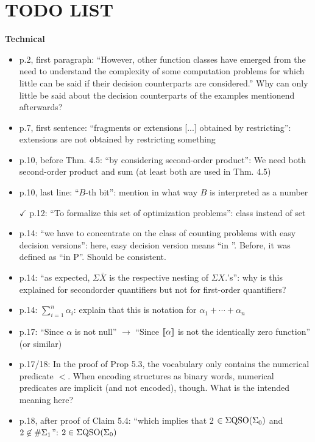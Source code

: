 
\section*{\LARGE \textbf{TODO LIST}}

\bigskip

{\bf Technical}

\begin{itemize}
	\setlength\itemsep{0.5em}
\item p.2, first paragraph: ``However, other function classes have emerged from the need to understand
the complexity of some computation problems for which little can be said if their
decision counterparts are considered.'' Why can only little be said about the decision counterparts
of the examples mentionend afterwards?
\item p.7, first sentence: ``fragments or extensions [...] obtained by restricting'': extensions are not
obtained by restricting something
\item p.10, before Thm. 4.5: ``by considering second-order product'': We need both second-order
product and sum (at least both are used in Thm. 4.5)
\item p.10, last line: ``$B$-th bit'': mention in what way $B$ is interpreted as a number
\item[$\checkmark$] p.12: ``To formalize this set of optimization problems'': class instead of set
\item p.14: ``we have to concentrate on the class of counting problems with easy decision versions'':
here, easy decision version means ``in \bpp''. Before, it was defined as ``in P''. Should be
consistent.
\item p.14: ``as expected, $\Sigma \bar{X}$ is the respective nesting of $\Sigma X.$’s'': why is this explained for secondorder
quantifiers but not for first-order quantifiers?
\item p.14: $\sum_{i=1}^n\alpha_i$: explain that this is notation for $\alpha_1+\cdots+\alpha_n$
\item p.17: ``Since $\alpha$ is not null'' $\to$ ``Since ${\llbracket{}{\alpha}\rrbracket}$ is not the identically zero function'' (or similar)
\item p.17/18: In the proof of Prop 5.3, the vocabulary only contains the numerical predicate $<$. When encoding structures as binary words, numerical predicates are implicit (and not
encoded), though. What is the intended meaning here?
\item p.18, after proof of Claim 5.4: ``which implies that 2 $\in \Sigma{\rm QSO}(\Sigma_0)$ and $2 \not\in \#\Sigma_{1}$'': $2 \in \Sigma{\rm QSO}(\Sigma_0)$

\end{itemize}
